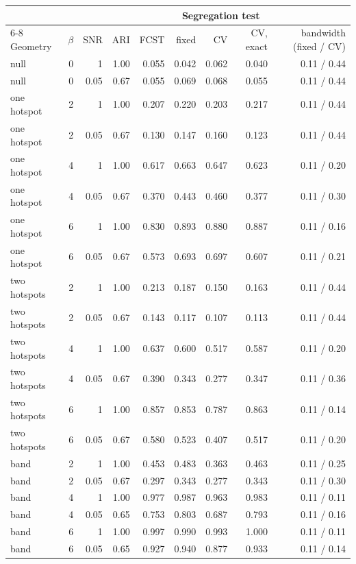 \begin{tabular}{@{}lrrrrrrrr@{}}
\toprule
 & & & & & \multicolumn{3}{c}{Segregation test} & \\
\cmidrule(lr){6-8}
Geometry & $\beta$ & SNR & ARI & FCST & fixed & CV & CV, exact & bandwidth (fixed / CV) \\
\midrule
null & 0 & 1 & 1.00 & 0.055 & 0.042 & 0.062 & 0.040 & 0.11 / 0.44 \\
null & 0 & 0.05 & 0.67 & 0.055 & 0.069 & 0.068 & 0.055 & 0.11 / 0.44 \\
one hotspot & 2 & 1 & 1.00 & 0.207 & 0.220 & 0.203 & 0.217 & 0.11 / 0.44 \\
one hotspot & 2 & 0.05 & 0.67 & 0.130 & 0.147 & 0.160 & 0.123 & 0.11 / 0.44 \\
one hotspot & 4 & 1 & 1.00 & 0.617 & 0.663 & 0.647 & 0.623 & 0.11 / 0.20 \\
one hotspot & 4 & 0.05 & 0.67 & 0.370 & 0.443 & 0.460 & 0.377 & 0.11 / 0.30 \\
one hotspot & 6 & 1 & 1.00 & 0.830 & 0.893 & 0.880 & 0.887 & 0.11 / 0.16 \\
one hotspot & 6 & 0.05 & 0.67 & 0.573 & 0.693 & 0.697 & 0.607 & 0.11 / 0.21 \\
two hotspots & 2 & 1 & 1.00 & 0.213 & 0.187 & 0.150 & 0.163 & 0.11 / 0.44 \\
two hotspots & 2 & 0.05 & 0.67 & 0.143 & 0.117 & 0.107 & 0.113 & 0.11 / 0.44 \\
two hotspots & 4 & 1 & 1.00 & 0.637 & 0.600 & 0.517 & 0.587 & 0.11 / 0.20 \\
two hotspots & 4 & 0.05 & 0.67 & 0.390 & 0.343 & 0.277 & 0.347 & 0.11 / 0.36 \\
two hotspots & 6 & 1 & 1.00 & 0.857 & 0.853 & 0.787 & 0.863 & 0.11 / 0.14 \\
two hotspots & 6 & 0.05 & 0.67 & 0.580 & 0.523 & 0.407 & 0.517 & 0.11 / 0.20 \\
band & 2 & 1 & 1.00 & 0.453 & 0.483 & 0.363 & 0.463 & 0.11 / 0.25 \\
band & 2 & 0.05 & 0.67 & 0.297 & 0.343 & 0.277 & 0.343 & 0.11 / 0.30 \\
band & 4 & 1 & 1.00 & 0.977 & 0.987 & 0.963 & 0.983 & 0.11 / 0.11 \\
band & 4 & 0.05 & 0.65 & 0.753 & 0.803 & 0.687 & 0.793 & 0.11 / 0.16 \\
band & 6 & 1 & 1.00 & 0.997 & 0.990 & 0.993 & 1.000 & 0.11 / 0.11 \\
band & 6 & 0.05 & 0.65 & 0.927 & 0.940 & 0.877 & 0.933 & 0.11 / 0.14 \\
\bottomrule
\end{tabular}
